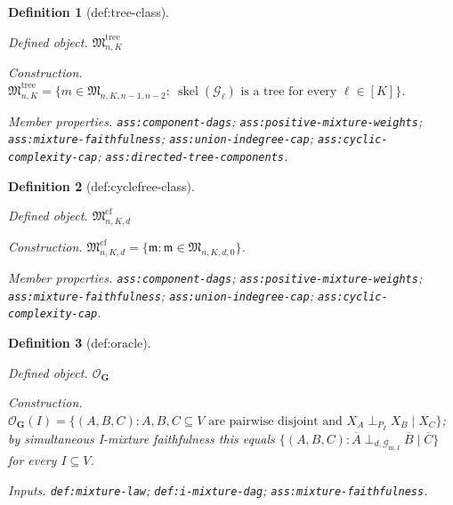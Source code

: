 \documentclass{article}
\newtheorem{definition}{Definition}
\begin{document}
\begin{definition}[def:tree-class]\label{def:tree-class}
\par\smallskip\noindent\emph{Defined object.} \(\mathfrak M^{\mathrm{tree}}_{n,K}\)
\par\smallskip\noindent\emph{Construction.} \(\mathfrak M^{\mathrm{tree}}_{n,K}=\{m\in\mathfrak M_{n,K,n-1,n-2}:\ \operatorname{skel}(\mathcal G_\ell)\text{ is a tree for every }\ell\in[K]\}\).
\par\smallskip\noindent\emph{Member properties.} \texttt{ass:\allowbreak{}component-\allowbreak{}dags}; \texttt{ass:\allowbreak{}positive-\allowbreak{}mixture-\allowbreak{}weights}; \texttt{ass:\allowbreak{}mixture-\allowbreak{}faithfulness}; \texttt{ass:\allowbreak{}union-\allowbreak{}indegree-\allowbreak{}cap}; \texttt{ass:\allowbreak{}cyclic-\allowbreak{}complexity-\allowbreak{}cap}; \texttt{ass:\allowbreak{}directed-\allowbreak{}tree-\allowbreak{}components}.
\end{definition}

\begin{definition}[def:cyclefree-class]\label{def:cyclefree-class}
\par\smallskip\noindent\emph{Defined object.} \(\mathfrak M^{\mathrm{cf}}_{n,K,d}\)
\par\smallskip\noindent\emph{Construction.} \(\mathfrak M^{\mathrm{cf}}_{n,K,d}=\{\mathfrak m:\mathfrak m\in\mathfrak M_{n,K,d,0}\}\).
\par\smallskip\noindent\emph{Member properties.} \texttt{ass:\allowbreak{}component-\allowbreak{}dags}; \texttt{ass:\allowbreak{}positive-\allowbreak{}mixture-\allowbreak{}weights}; \texttt{ass:\allowbreak{}mixture-\allowbreak{}faithfulness}; \texttt{ass:\allowbreak{}union-\allowbreak{}indegree-\allowbreak{}cap}; \texttt{ass:\allowbreak{}cyclic-\allowbreak{}complexity-\allowbreak{}cap}.
\end{definition}

\begin{definition}[def:oracle]\label{def:oracle}
\par\smallskip\noindent\emph{Defined object.} \(\mathcal O_{\mathbf G}\)
\par\smallskip\noindent\emph{Construction.} \(\mathcal O_{\mathbf G}(I)=\{(A,B,C):A,B,C\subseteq V\text{ are pairwise disjoint and }X_A\perp_{P_I}X_B\mid X_C\}\); by simultaneous I-mixture faithfulness this equals \(\{(A,B,C):\overline A\perp_{d,\mathcal G_{\mathrm m,I}}\overline B\mid\overline C\}\) for every \(I\subseteq V\).
\par\smallskip\noindent\emph{Inputs.} \texttt{def:\allowbreak{}mixture-\allowbreak{}law}; \texttt{def:\allowbreak{}i-\allowbreak{}mixture-\allowbreak{}dag}; \texttt{ass:\allowbreak{}mixture-\allowbreak{}faithfulness}.
\end{definition}
\end{document}
